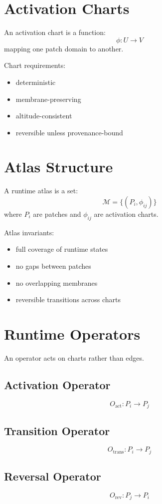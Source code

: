 \documentclass[12pt]{article}
\begin{document}
\section{Activation Charts}

An activation chart is a function:
\[
\phi : U \rightarrow V
\]
mapping one patch domain to another.

Chart requirements:
\begin{itemize}
  \item deterministic
  \item membrane-preserving
  \item altitude-consistent
  \item reversible unless provenance-bound
\end{itemize}

\section{Atlas Structure}

A runtime atlas is a set:
\[
\mathcal{M} = \{(P_i, \phi_{ij})\}
\]
where $P_i$ are patches and $\phi_{ij}$ are activation charts.

Atlas invariants:
\begin{itemize}
  \item full coverage of runtime states
  \item no gaps between patches
  \item no overlapping membranes
  \item reversible transitions across charts
\end{itemize}

\section{Runtime Operators}

An operator acts on charts rather than edges.

\subsection{Activation Operator}
\[
O_{\text{act}} : P_i \rightarrow P_j
\]

\subsection{Transition Operator}
\[
O_{\text{trans}} : P_i \rightarrow P_j
\]

\subsection{Reversal Operator}
\[
O_{\text{rev}} : P_j \rightarrow P_i
\]
\end{document}
